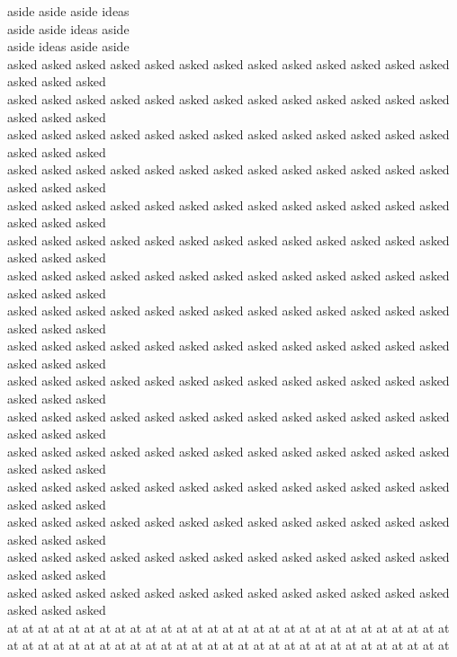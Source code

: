 aside aside aside ideas\\
aside aside ideas aside\\
aside ideas aside aside\\
asked asked asked asked asked asked asked asked asked asked asked asked asked asked asked asked\\
asked asked asked asked asked asked asked asked asked asked asked asked asked asked asked asked\\
asked asked asked asked asked asked asked asked asked asked asked asked asked asked asked asked\\
asked asked asked asked asked asked asked asked asked asked asked asked asked asked asked asked\\
asked asked asked asked asked asked asked asked asked asked asked asked asked asked asked asked\\
asked asked asked asked asked asked asked asked asked asked asked asked asked asked asked asked\\
asked asked asked asked asked asked asked asked asked asked asked asked asked asked asked asked\\
asked asked asked asked asked asked asked asked asked asked asked asked asked asked asked asked\\
asked asked asked asked asked asked asked asked asked asked asked asked asked asked asked asked\\
asked asked asked asked asked asked asked asked asked asked asked asked asked asked asked asked\\
asked asked asked asked asked asked asked asked asked asked asked asked asked asked asked asked\\
asked asked asked asked asked asked asked asked asked asked asked asked asked asked asked asked\\
asked asked asked asked asked asked asked asked asked asked asked asked asked asked asked asked\\
asked asked asked asked asked asked asked asked asked asked asked asked asked asked asked asked\\
asked asked asked asked asked asked asked asked asked asked asked asked asked asked asked asked\\
asked asked asked asked asked asked asked asked asked asked asked asked asked asked asked asked\\
at at at at at at at at at at at at at at at at at at at at at at at at at at at at at\\
at at at at at at at at at at at at at at at at at at at at at at at at at at at at at\\
